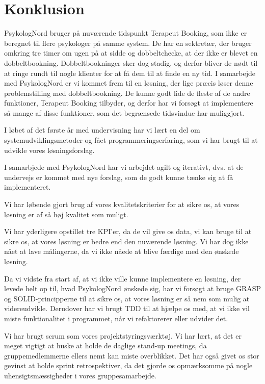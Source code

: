 \section{Konklusion}
PsykologNord bruger på nuværende tidspunkt Terapeut Booking, som ikke er beregnet til flere psykologer på samme system.
De har en sektretær, der bruger omkring tre timer om ugen på at sidde og dobbeltchecke, at der ikke er blevet en dobbeltbookning.
Dobbeltbookninger sker dog stadig, og derfor bliver de nødt til at ringe rundt til nogle klienter for at få dem til at finde en ny tid.
I samarbejde med PsykologNord er vi kommet frem til en løsning, der lige præcis løser denne problemstilling med dobbeltbookning.
De kunne godt lide de fleste af de andre funktioner, Terapeut Booking tilbyder, og derfor har vi forsøgt at implementere så mange af disse funktioner, som det begrænsede tidsvindue har muliggjort.

I løbet af det første år med undervisning har vi lært en del om systemudviklingsmetoder og fået programmeringserfaring, som vi har brugt til at udvikle vores løsningsforslag.

I samarbjede med PsykologNord har vi arbejdet agilt og iterativt, dvs. at de undervejs er kommet med nye forslag, som de godt kunne tænke sig at få implementeret.

Vi har løbende gjort brug af vores kvalitetskriterier for at sikre os, at vores løsning er af så høj kvalitet som muligt.

Vi har yderligere opstillet tre KPI'er, da de vil give os data, vi kan bruge til at sikre os, at vores løsning er bedre end den nuværende løsning.
Vi har dog ikke nået at lave målingerne, da vi ikke nåede at blive færdige med den ønskede løsning.

Da vi vidste fra start af, at vi ikke ville kunne implementere en løsning, der levede helt op til, hvad PsykologNord ønskede sig, har vi forsøgt at bruge GRASP og SOLID-principperne til at sikre os, at vores løsning er så nem som mulig at videreudvikle.
Derudover har vi brugt TDD til at hjælpe os med, at vi ikke vil miste funktionalitet i programmet, når vi refaktorerer eller udvider det.

Vi har brugt scrum som vores projektstyringsværktøj.
Vi har lært, at det er meget vigtigt at huske at holde de daglige stand-up meetings, da gruppemedlemmerne ellers nemt kan miste overblikket.
Det har også givet os stor gevinst at holde sprint retrospektiver, da det gjorde os opmærksomme på nogle uhensigtsmæssigheder i vores gruppesamarbejde.